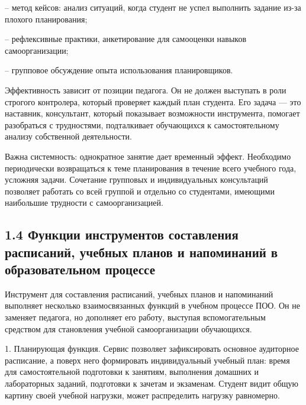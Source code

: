 \documentclass[
]{article}
\begin{document}
-- метод кейсов: анализ ситуаций, когда студент не успел выполнить
задание из-за плохого планирования;

-- рефлексивные практики, анкетирование для самооценки навыков
самоорганизации;

-- групповое обсуждение опыта использования планировщиков.

Эффективность зависит от позиции педагога. Он не должен выступать в роли
строгого контролера, который проверяет каждый план студента. Его задача
--- это наставник, консультант, который показывает возможности
инструмента, помогает разобраться с трудностями, подталкивает
обучающихся к самостоятельному анализу собственной деятельности.

Важна системность: однократное занятие дает временный эффект. Необходимо
периодически возвращаться к теме планирования в течение всего учебного
года, усложняя задачи. Сочетание групповых и индивидуальных консультаций
позволяет работать со всей группой и отдельно со студентами, имеющими
наибольшие трудности с самоорганизацией.

\subsection{\texorpdfstring{\textbf{1.4 Функции инструментов составления
расписаний, учебных планов и напоминаний в образовательном
процессе}}{1.4 Функции инструментов составления расписаний, учебных планов и напоминаний в образовательном процессе}}\label{ux444ux443ux43dux43aux446ux438ux438-ux438ux43dux441ux442ux440ux443ux43cux435ux43dux442ux43eux432-ux441ux43eux441ux442ux430ux432ux43bux435ux43dux438ux44f-ux440ux430ux441ux43fux438ux441ux430ux43dux438ux439-ux443ux447ux435ux431ux43dux44bux445-ux43fux43bux430ux43dux43eux432-ux438-ux43dux430ux43fux43eux43cux438ux43dux430ux43dux438ux439-ux432-ux43eux431ux440ux430ux437ux43eux432ux430ux442ux435ux43bux44cux43dux43eux43c-ux43fux440ux43eux446ux435ux441ux441ux435}

Инструмент для составления расписаний, учебных планов и напоминаний
выполняет несколько взаимосвязанных функций в учебном процессе ПОО. Он
не заменяет педагога, но дополняет его работу, выступая вспомогательным
средством для становления учебной самоорганизации обучающихся.

1. Планирующая функция. Сервис позволяет зафиксировать основное
аудиторное расписание, а поверх него формировать индивидуальный учебный
план: время для самостоятельной подготовки к занятиям, выполнения
домашних и лабораторных заданий, подготовки к зачетам и экзаменам.
Студент видит общую картину своей учебной нагрузки, может распределить
нагрузку равномерно.
\end{document}
